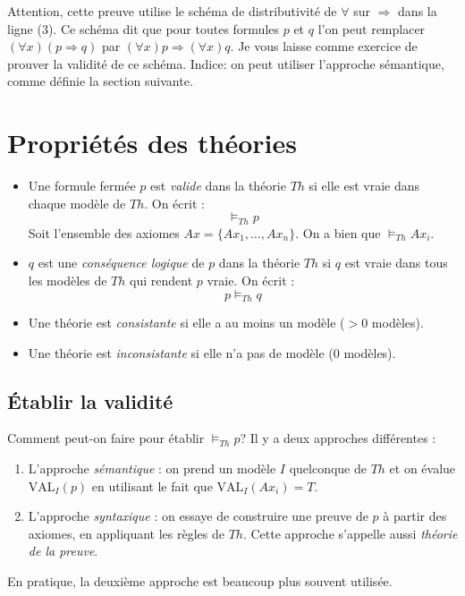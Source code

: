 {Attention, cette preuve utilise le schéma de distributivité de $\forall$ sur $\Rightarrow$
dans la ligne (3).
Ce schéma dit que pour toutes formules $p$ et $q$
l'on peut remplacer $(\forall x) (p \Rightarrow q)$
par $(\forall x) p \Rightarrow (\forall x) q$.
Je vous laisse comme exercice de prouver la validité de ce schéma.
Indice: on peut utiliser l'approche sémantique, comme définie la section suivante.

\section{Propriétés des théories}

\begin{itemize}
\item Une formule fermée $p$ est \textit{valide} dans la théorie $Th$ si elle est vraie dans chaque modèle de $Th$. On écrit : 
$$\models_{Th} p$$
Soit l'ensemble des axiomes $Ax=\{Ax_1, \hdots, Ax_n\}$. On a bien que $\models_{Th} Ax_i$.\\
\item $q$ est une \textit{conséquence logique} de $p$ dans la théorie $Th$
si $q$ est vraie dans tous les modèles de $Th$ qui rendent $p$ vraie.
On écrit :  $$p \models_{Th} q$$
\item Une théorie est \textit{consistante} si elle a au moins un modèle ($>0$ modèles).
\item Une théorie est \textit{inconsistante} si elle n'a pas de modèle ($0$ modèles).\\
\end{itemize}

\subsection{Établir la validité}

Comment peut-on faire pour établir $\models_{Th} p$? Il y a deux approches différentes :
\begin{enumerate}
\item L'approche {\em sémantique} : on prend un modèle $I$ quelconque de $Th$ et on évalue $\textrm{VAL}_I (p)$
en utilisant le fait que $\text{VAL}_I (Ax_i)=T$.
\item L'approche {\em syntaxique} : on essaye de construire une preuve de $p$ à partir des axiomes, en appliquant les règles de $Th$.
Cette approche s'appelle aussi {\em théorie de la preuve}.\\
\end{enumerate}
En pratique, la deuxième approche est beaucoup plus souvent utilisée.\\

}
